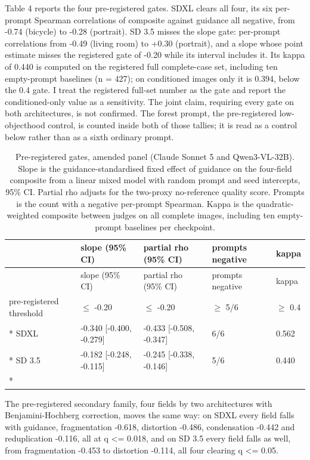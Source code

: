 \documentclass[11pt]{article}
\begin{document}
Table 4 reports the four pre-registered gates. SDXL clears all four, its six
per-prompt Spearman correlations of composite against guidance all negative,
from -0.74 (bicycle) to -0.28 (portrait). SD 3.5 misses the slope gate:
per-prompt correlations from -0.49 (living room) to +0.30 (portrait), and a
slope whose point estimate misses the registered gate of -0.20 while its
interval includes it. Its kappa of 0.440 is computed on the registered full
complete-case set, including ten empty-prompt baselines (n = 427); on
conditioned images only it is 0.394, below the 0.4 gate. I treat the registered
full-set number as the gate and report the conditioned-only value as a
sensitivity. The joint claim, requiring every gate on both architectures, is not
confirmed. The forest prompt, the pre-registered low-objecthood control, is
counted inside both of those tallies; it is read as a control below rather than
as a sixth ordinary prompt.

\begin{longtable}[]{@{}lllll@{}}
\caption{Pre-registered gates, amended panel (Claude Sonnet 5 and Qwen3-VL-32B).
Slope is the guidance-standardised fixed effect of guidance on the four-field
composite from a linear mixed model with random prompt and seed intercepts, 95\%
CI. Partial rho adjusts for the two-proxy no-reference quality score. Prompts is
the count with a negative per-prompt Spearman. Kappa is the quadratic-weighted
composite between judges on all complete images, including ten empty-prompt
baselines per checkpoint.}\tabularnewline
\toprule\noalign{}
& slope (95\% CI) & partial rho (95\% CI) & prompts negative & kappa \\
\midrule\noalign{}
\endfirsthead
\toprule\noalign{}
& slope (95\% CI) & partial rho (95\% CI) & prompts negative & kappa \\
\midrule\noalign{}
\endhead
\bottomrule\noalign{}
\endlastfoot
pre-registered threshold & \(\le\) -0.20 & \(\le\) -0.20 & \(\ge\) 5/6 & \(\ge\)
0.4 \\*
SDXL & -0.340 {[}-0.400, -0.279{]} & -0.433 {[}-0.508, -0.347{]} & 6/6 &
0.562 \\*
SD 3.5 & -0.182 {[}-0.248, -0.115{]} & -0.245 {[}-0.338, -0.146{]} & 5/6 &
0.440 \\*
\end{longtable}

The pre-registered secondary family, four fields by two architectures with
Benjamini-Hochberg correction, moves the same way: on SDXL every field falls
with guidance, fragmentation -0.618, distortion -0.486, condensation -0.442 and
reduplication -0.116, all at q \textless= 0.018, and on SD 3.5 every field falls
as well, from fragmentation -0.453 to distortion -0.114, all four clearing q
\textless= 0.05.
\end{document}
